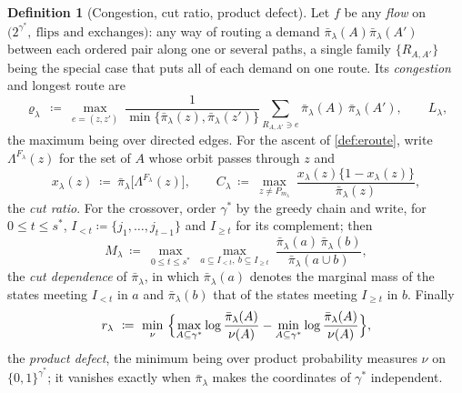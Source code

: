 \documentclass[aos]{imsart}
\theoremstyle{plain}
\theoremstyle{definition}
\newtheorem{definition}{Definition}[section]
\begin{document}
    \begin{definition}[Congestion, cut ratio, product defect]
        \label{def:dipA}
        Let $f$ be any \emph{flow} on
        $\bigl(2^{\gamma^{\ast}},\ \text{flips and exchanges}\bigr)$: any
        way of routing a demand
        $\bar\pi_\lambda(A)\bar\pi_\lambda(A')$ between each ordered pair
        along one or several paths, a single family $\{R_{A,A'}\}$ being the
        special case that puts all of each demand on one route. Its
        \emph{congestion} and longest route are
        \begin{equation}
            \label{eq:varrhoA}
            \varrho_\lambda\ \coloneq\ \max_{e=(z,z')}\
            \frac{1}{\min\{\bar\pi_\lambda(z),\bar\pi_\lambda(z')\}}
            \sum_{R_{A,A'}\ni e}\bar\pi_\lambda(A)\,\bar\pi_\lambda(A') ,
            \qquad L_\lambda ,
        \end{equation}
        the maximum being over directed edges. For the ascent of
        \cref{def:eroute}, write $\Lambda^{F_\lambda}(z)$ for the set of $A$
        whose orbit passes through $z$ and
        \begin{equation}
            \label{eq:cut}
            x_\lambda(z)\ \coloneq\
            \bar\pi_\lambda\bigl[\Lambda^{F_\lambda}(z)\bigr],
            \qquad
            C_\lambda\ \coloneq\ \max_{z\neq P_{m_\lambda}}\
            \frac{x_\lambda(z)\bigl\{1-x_\lambda(z)\bigr\}}
            {\bar\pi_\lambda(z)} ,
        \end{equation}
        the \emph{cut ratio}. For the crossover, order $\gamma^{\ast}$ by
        the greedy chain and write, for $0\leq t\leq s^{\ast}$,
        $I_{<t}\coloneq\{j_1,\dots,j_{t-1}\}$ and $I_{\geq t}$ for its
        complement; then
        \begin{equation}
            \label{eq:Mdef}
            M_\lambda\ \coloneq\ \max_{0\leq t\leq s^{\ast}}\
            \max_{a\subseteq I_{<t},\ b\subseteq I_{\geq t}}\
            \frac{\bar\pi_\lambda(a)\,\bar\pi_\lambda(b)}
            {\bar\pi_\lambda(a\cup b)} ,
        \end{equation}
        the \emph{cut dependence} of $\bar\pi_\lambda$, in which
        $\bar\pi_\lambda(a)$ denotes the marginal mass of the states meeting
        $I_{<t}$ in $a$ and $\bar\pi_\lambda(b)$ that of the states meeting
        $I_{\geq t}$ in $b$. Finally
        \begin{equation}
            \label{eq:pdefect}
            r_\lambda\ \coloneq\ \min_{\nu}\ \Bigl\{
            \max_{A\subseteq\gamma^{\ast}}
            \log\frac{\bar\pi_\lambda(A)}{\nu(A)}
            -\min_{A\subseteq\gamma^{\ast}}
            \log\frac{\bar\pi_\lambda(A)}{\nu(A)}\Bigr\} ,
        \end{equation}
        the \emph{product defect}, the minimum being over product
        probability measures $\nu$ on $\{0,1\}^{\gamma^{\ast}}$; it vanishes
        exactly when $\bar\pi_\lambda$ makes the coordinates of
        $\gamma^{\ast}$ independent.
    \end{definition}
\end{document}
